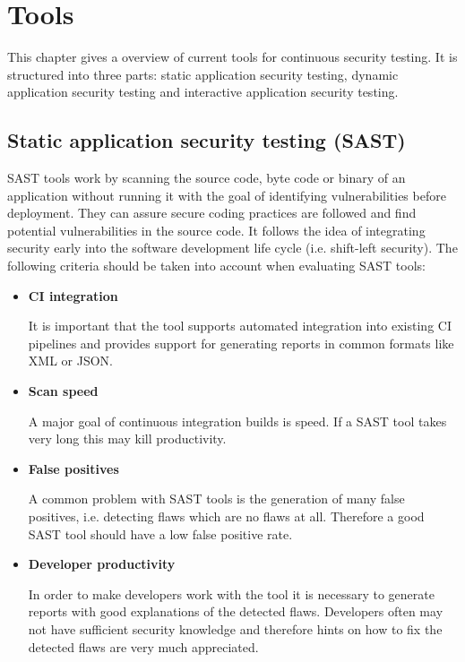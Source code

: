 \documentclass[conference]{IEEEtran}
\begin{document}
\newpage

\section{Tools}

This chapter gives a overview of current tools for continuous security testing. It is structured into three parts: static application security testing, dynamic application security testing and interactive application security testing.

\subsection{Static application security testing (SAST)}

SAST tools work by scanning the source code, byte code or binary of an application without running it with the goal of identifying vulnerabilities before deployment. They can assure secure coding practices are followed and find potential vulnerabilities in the source code. It follows the idea of integrating security early into the software development life cycle (i.e. shift-left security). The following criteria should be taken into account when evaluating SAST tools: \\

\begin{itemize}
	\item \textbf{CI integration}
	
	It is important that the tool supports automated integration into existing CI pipelines and provides support for generating reports in common formats like XML or JSON.
	
	\item \textbf{Scan speed}
	
	A major goal of continuous integration builds is speed. If a SAST tool takes very long this may kill productivity.
	
	\item \textbf{False positives}
	
	A common problem with SAST tools is the generation of many false positives, i.e. detecting flaws which are no flaws at all. Therefore a good SAST tool should have a low false positive rate.
	
	\item \textbf{Developer productivity}
	
	In order to make developers work with the tool it is necessary to generate reports with good explanations of the detected flaws. Developers often may not have sufficient security knowledge and therefore hints on how to fix the detected flaws are very much appreciated.\\
\end{itemize}
\end{document}
